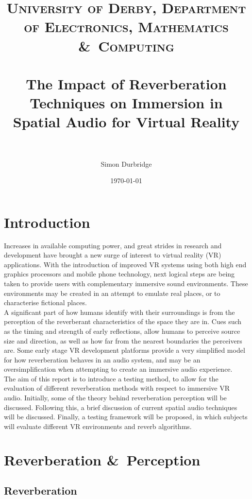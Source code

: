 \documentclass[paper=a4, fontsize=11pt]{scrartcl} %
\title{	
\normalfont \normalsize 
\textsc{University of Derby, Department of Electronics, Mathematics \&\ Computing} \\ [25pt] %
\horrule{0.5pt} \\[0.4cm] %
\huge The Impact of Reverberation Techniques on Immersion in Spatial Audio for Virtual Reality \\ %
\horrule{2pt} \\[0.5cm] %
}
\author{Simon Durbridge} %
\date{\normalsize\today} %
\numberwithin{equation}{section} %
\numberwithin{figure}{section} %
\numberwithin{table}{section} %
\begin{document}
\maketitle %


\section{Introduction}

Increases in available computing power, and great strides in research and development have brought a new surge of interest to virtual reality (VR) applications. With the introduction of improved VR systems using both high end graphics processors and mobile phone technology, next logical steps are being taken to provide users with complementary immersive sound environments. These environments may be created in an  attempt to emulate real places, or to characterise fictional places.\\
A significant part of how humans identify with their surroundings is from the perception of the reverberant characteristics of the space they are in. Cues such as the timing and strength of early reflections, allow humans to perceive source size and direction, as well as how far from the nearest boundaries the perceivers are. Some early stage VR development platforms provide a very simplified model for how reverberation behaves in an audio system, and may be an oversimplification when attempting to create an immersive audio experience.\\ 	The aim of this report is to introduce a testing method, to allow for the evaluation of different reverberation methods with respect to immersive VR audio. Initially, some of the theory behind reverberation perception will be discussed. Following this, a brief discussion of current spatial audio techniques will be discussed. Finally, a testing framework will be proposed, in which subjects will evaluate different VR environments and reverb algorithms.

\section{Reverberation \&\ Perception}
\subsection{Reverberation}
\end{document}
